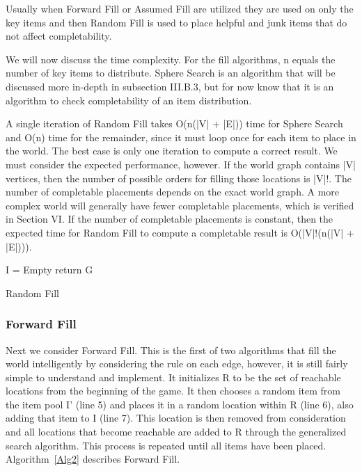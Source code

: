 \documentclass{ieeeaccess}
\begin{document}
Usually when Forward Fill or Assumed Fill are utilized they are used on only the key items and
then Random Fill is used to place helpful and junk items that do not affect completability.

We will now discuss the time complexity. For the fill algorithms, n equals the number of key
items to distribute. Sphere Search is an algorithm that will be discussed more in-depth 
in subsection III.B.3, but for now know that it is an algorithm to check completability of 
an item distribution.

A single iteration of Random Fill takes O(n(|V| + |E|)) time for Sphere Search and O(n) time 
for the remainder, since it must loop once for each item to place in the world.
The best case is only one iteration to compute a correct result.
We must consider the expected performance, however. If the world graph contains |V| 
vertices, then the number of possible orders for filling those locations is |V|!.
The number of completable placements depends on the exact world graph. 
A more complex world will generally have fewer completable placements, 
which is verified in Section VI.
If the number of completable placements is constant,
then the expected time for Random Fill to compute a completable
result is O(|V|!(n(|V| + |E|))).

\begin{algorithm}
\label{Alg1}
\SetAlgoLined
{}
 I = Empty\;
  return G\;
 \caption{Random Fill}
\end{algorithm}

\subsubsection{Forward Fill}
Next we consider Forward Fill. This is the first of two algorithms that fill the world
intelligently by considering the rule on each edge, however, it is still fairly simple to
understand and implement. It initializes R to be the set of reachable locations from the
beginning of the game. It then chooses a random item from the item pool I' (line 5)
and places it in a random location within R (line 6), also adding that item to I (line 7). 
This location is then removed from consideration and all locations that become reachable 
are added to R through the generalized search algorithm. This process is repeated until 
all items have been placed. Algorithm~\ref{Alg2} describes Forward Fill.
\end{document}
